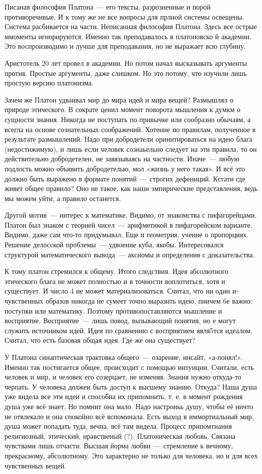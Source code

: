 Писаная философия Платона~--- его тексты, разрозненные и порой противоречивые. И к тому же не все вопросы для прлной системы освещены. Система расбивается на части. 
Неписанная философия Платона. Здесь все острые ммоменты игнорируются. Именно так преподавалось в платоновско й академии. Это воспроизводимо и лучше для преподавания, но не выражает всю глубину. 

Аристотель 20 лет провел в академии. Но потом начал высказывать аргументы против. Простые аргументы, даже слишком. Но это потому, что изучили лишь простую версию платонизма. 

Зачем же Платон удваивал мир до мира идей и мира вещей?
Размышлял о природе этического. В сократе ценил момент поворота мышления к думкм о сущности знания. Никогда не поступать по привычке или сообразно обычаям, а всегла на основе сознательных соображений. 
Хотение по правилам, полученное в результате размышлений. Надо при добродетели ориннтироваться на идею блага (недостижимую), и лишь если человек сознаьельно следует на эти правила, то он действительно добродетелен, не завязываясь на частности. 
Иначе~--- любую подлость можно объявить добродетелью, мол «жизнь у него такая». 
И всё это должно быть выражено в формате понятий~--- строгих дефениций. Кстати где живет общее правило? Оно не такое, как наши эмпирические представления, ведь мы можем уйти, а правило останется. 

Другой мотив~--- интерес к математике. Видимо, от знакомства с пифагорейцами. 
Платон был знаком с теорией чисел~--- арифметикой в пифагорейском варианте. Видимо, даже сам что-то придумывал. Еще и геометрия, учение о пропорциях. 
Решение делосской проблемы~--- удвоение куба, якобы. Интересовался структурой математического вывода~--- аксиомы и определения с доказательства. 

К тому платон стремился к общему. Итого следствия. 
Идея абсолютного этического блага не может полностью и в точности воплотиться, хотя и существует. И число 4 не может материализоваться. Считал, что ни один и- чувственных образов никогда не сумеет точно выразить идею, пничем 6е важно: поступки или математику. Поэтому противопоставляются мышление и восприятие. 
Восприятие~--- лишь повод, вызывающий понятия, но е могут служить источником идей. Идея по сравнению с восприятием явля5тся идеалом. Считал, что есть базовая общая идея. Где же она существует?

У Платона синаптическая трактовка общего~--- озарение, инсайт, «а-понял!». Именно так постигается общее, происходит с помощью интуиции. Считали, есть человек и мир, и человек его созерцает, не изменяя. 
Знания нужно откуда-то черпать. У человека должен быть доступ к высшему знанию. Откуда? Наша душа уже видела все эти идеи и способна их припомнить, т. е. в момент рождения душа уже всё знает. 
Но помнит она мало. Надо настроиьь душу, чтобы её ничто не отвлекало и она спокойно всё вспоминала. 
Есть выход в иммортиальный мир, душа может попадать туда, вечна, всё там видела. Процесс припомтнания религиозный, этический, нравственый (?). Платоническая любовь. Связана чувствами лишь отчасти. Высшая йорма любви~--- стремление к вечному, прекрасному, абсолютному. Это характерно не только для человека, но и для всех чувственных вещей. 
